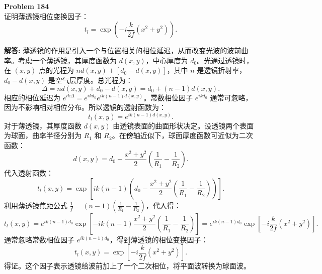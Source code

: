 \documentclass[12pt, a4paper, oneside]{ctexart}
\newenvironment{solution}{\par\noindent\textbf{解答:}\quad}{\par}
\begin{document}
\begin{mdframed}[backgroundcolor=gray!10, linewidth=0pt]
    \textbf{Problem 184} \\
    证明薄透镜相位变换因子：
    \[
    t_l = \exp\left( -i \frac{k}{2f} (x^2 + y^2) \right).
    \]
\end{mdframed}
\begin{solution}
    薄透镜的作用是引入一个与位置相关的相位延迟，从而改变光波的波前曲率。考虑一个薄透镜，其厚度函数为 $d(x,y)$，中心厚度为 $d_0$。光通过透镜时，在 $(x,y)$ 点的光程为 $n d(x,y) + [d_0 - d(x,y)]$，其中 $n$ 是透镜折射率，$d_0 - d(x,y)$ 是空气层厚度。总光程为：
    \[
    \Delta = n d(x,y) + d_0 - d(x,y) = d_0 + (n-1) d(x,y).
    \]
    相应的相位延迟为 $e^{i k \Delta} = e^{i k d_0} e^{i k (n-1) d(x,y)}$。常数相位因子 $e^{i k d_0}$ 通常可忽略，因为不影响相对相位分布。所以透镜的透射函数为：
    \[
    t_l(x,y) = e^{i k (n-1) d(x,y)}.
    \]
    对于薄透镜，其厚度函数 $d(x,y)$ 由透镜表面的曲面形状决定。设透镜两个表面为球面，曲率半径分别为 $R_1$ 和 $R_2$。在傍轴近似下，球面厚度函数可近似为二次函数：
    \[
    d(x,y) = d_0 - \frac{x^2+y^2}{2} \left( \frac{1}{R_1} - \frac{1}{R_2} \right).
    \]
    代入透射函数：
    \[
    t_l(x,y) = \exp\left[ i k (n-1) \left( d_0 - \frac{x^2+y^2}{2} \left( \frac{1}{R_1} - \frac{1}{R_2} \right) \right) \right].
    \]
    利用薄透镜焦距公式 $\frac{1}{f} = (n-1)\left( \frac{1}{R_1} - \frac{1}{R_2} \right)$，代入得：
    \[
    t_l(x,y) = e^{i k (n-1) d_0} \exp\left[ -i k (n-1) \frac{x^2+y^2}{2} \left( \frac{1}{R_1} - \frac{1}{R_2} \right) \right] = e^{i k (n-1) d_0} \exp\left[ -i \frac{k}{2f} (x^2+y^2) \right].
    \]
    通常忽略常数相位因子 $e^{i k (n-1) d_0}$，得到薄透镜的相位变换因子：
    \[
    t_l(x,y) = \exp\left[ -i \frac{k}{2f} (x^2+y^2) \right].
    \]
    得证。这个因子表示透镜给波前加上了一个二次相位，将平面波转换为球面波。
\end{solution}
\end{document}

